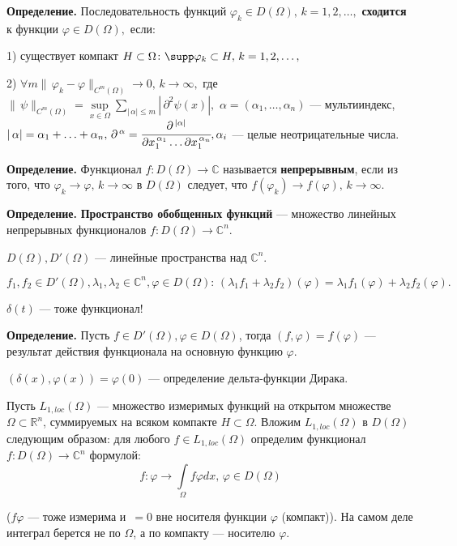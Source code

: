 \documentclass[12pt,a4paper,draft]{article}
\DeclareRobustCommand*{\т}{~--- }
\DeclareRobustCommand*{\ч}{~-- }
\begin{document}
\textbf{Определение.} Последовательность функций $\varphi_k\in
D(\Omega),\,k=1,2,\ldots,$ \textbf{сходится} к функции $\varphi\in
D(\Omega),$ если:

1) существует компакт $H\subset\Omega\colon \supp \varphi_k\subset
H,\,k=1,2,\ldots,$

2) $\forall m
\|\,\varphi_k-\varphi\|_{C^m(\Omega)}\to0,\,k\to{\infty},$ где
$\|\,\psi\|_{C^m(\Omega)}=\sup\limits_{x\in\Omega}
\sum\limits_{|\,\alpha|\le m} |\,\partial^2\psi(x)|,$
$\alpha=(\alpha_1,\ldots,\alpha_n)$ --- мультииндекс,
$|\,\alpha|=\alpha_1+\ldots+\alpha_n, \,\partial^{\,\alpha}=\cfrac
{\partial^{\,|\alpha|}}{\partial x_1^{\,\alpha_1}\ldots \partial
x_1^{\,\alpha_n}}, \alpha_i$ --- целые неотрицательные числа.

\textbf{Определение.} Функционал $f\colon D(\Omega)\to\mathbb C$
называется \textbf{непрерывным}, если из того, что
$\varphi_k\to\varphi,\,k\to{\infty}$ в $D(\Omega)$ следует, что
$f(\varphi_k)\to f(\varphi),\,k\to{\infty}.$

\textbf{Определение.} \textbf{Пространство обобщенных функций} ---
множество линейных непрерывных функционалов $f\colon
D(\Omega)\to\mathbb C^n.$

$D(\Omega), D'(\Omega)$ --- линейные пространства над $\mathbb
C^n$.

$f_1,f_2\in D'(\Omega), \lambda_1,\lambda_2\in \mathbb C^n,
\varphi\in D(\Omega)\colon\,
(\lambda_1f_1+\lambda_2f_2)(\varphi)=\lambda_1f_1(\varphi)+\lambda_2f_2(\varphi).$

$\delta(t)$ --- тоже функционал!

\textbf{Определение.} Пусть $f\in D'(\Omega), \varphi\in
D(\Omega)$, тогда $(f,\varphi)=f(\varphi)$ --- результат действия
функционала на основную функцию $\varphi$.

$(\delta(x),\varphi(x))=\varphi(0)$ --- определение дельта-функции
Дирака.

Пусть $L_{1,loc}(\Omega)$ --- множество измеримых функций на
открытом множестве $\Omega\subset\mathbb R^n$, суммируемых на
всяком компакте $H\subset\Omega$. Вложим $L_{1,loc}(\Omega)$ в
$D(\Omega)$ следующим образом: для любого $f\in L_{1,loc}(\Omega)$
определим функционал $f\colon D(\Omega)\to\mathbb C^n$ формулой:
$$f\colon\varphi\to\int\limits_{\Omega}f\varphi dx, \, \varphi\in D(\Omega)$$

($f\varphi$ --- тоже измерима и $\,=0$ вне носителя функции
$\varphi$ (компакт)). На самом деле интеграл берется  не по
$\Omega$, а по компакту --- носителю $\varphi$.
\end{document}
